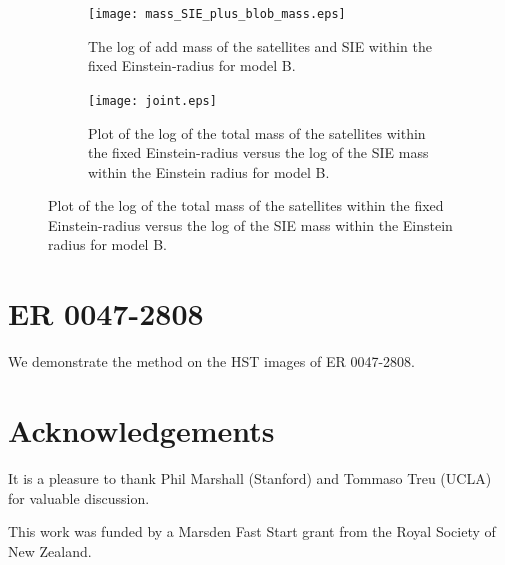 \documentclass[useAMS,usenatbib]{mn2e}
\begin{document}
\begin{figure}
\hspace{10pt}
\begin{subfigure}{.5\textwidth}
\vspace{-12pt}
  \centering
  \texttt{[image: mass\_SIE\_plus\_blob\_mass.eps]}
\parbox{0.8\linewidth}{\caption{The log of add mass of the satellites and SIE within the fixed Einstein-radius for model B.   \label{fig:sub5}}}
\end{subfigure}
\begin{subfigure}{.5\textwidth}
  \centering
  \texttt{[image: joint.eps]}
\parbox{0.8\linewidth}{\caption{Plot of the log of the total mass of the satellites within the fixed Einstein-radius versus the 
log of the SIE mass within the Einstein radius for model B.  \label{fig:sub6} }}
\end{subfigure}

   \end{figure}

  
  

\section{ER 0047-2808}
We demonstrate the method on the HST images of ER 0047-2808.



\section*{Acknowledgements}
It is a pleasure to thank Phil Marshall (Stanford) and Tommaso Treu (UCLA)
for valuable discussion.

This work was funded by a Marsden Fast Start grant from the Royal Society of
New Zealand.
\end{document}

